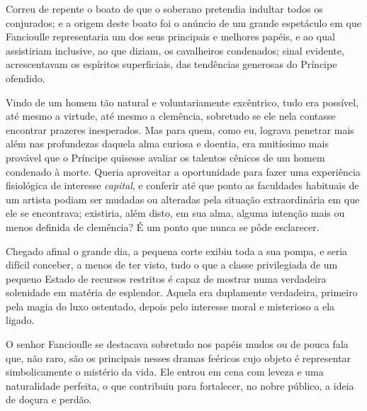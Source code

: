 Correu de repente o boato de que o soberano pretendia indultar todos os
conjurados; e a origem deste boato foi o anúncio de um grande
espetáculo em que Fancioulle representaria um dos seus principais e
melhores papéis, e ao qual assistiriam inclusive, ao que diziam, os
cavalheiros condenados; sinal evidente, acrescentavam os espíritos
superficiais, das tendências generosas do Príncipe ofendido.

Vindo de um homem tão natural e voluntariamente excêntrico, tudo era
possível, até mesmo a virtude, até mesmo a clemência, sobretudo se ele nela 
contasse encontrar prazeres inesperados. Mas para quem,
como eu, lograva penetrar mais além nas profundezas daquela
alma curiosa e doentia, era muitíssimo mais provável que o Príncipe
quisesse avaliar os talentos cênicos de um homem condenado à
morte. Queria aproveitar a oportunidade para fazer uma experiência
fisiológica de interesse \textit{capital}, e conferir até que ponto as
faculdades habituais de um artista podiam ser mudadas ou alteradas
pela situação extraordinária em que ele se encontrava;
existiria, além disto, em sua alma, alguma intenção mais ou menos definida
de clemência? É um ponto que nunca se pôde esclarecer.

\quebra

Chegado afinal o grande dia, a pequena corte exibiu toda a sua pompa,
e seria difícil conceber, a menos de ter visto, tudo o que a classe
privilegiada de um pequeno Estado de recursos restritos é capaz de mostrar
numa verdadeira solenidade em matéria de esplendor. Aquela era duplamente
verdadeira, primeiro pela magia do luxo ostentado, depois pelo
interesse moral e misterioso a ela ligado.

O senhor Fancioulle se destacava sobretudo nos papéis mudos ou de
pouca fala que, não raro, são os principais nesses dramas feéricos
cujo objeto é representar simbolicamente o mistério da vida. Ele entrou
em cena com leveza e uma naturalidade perfeita, o que contribuiu
para fortalecer, no nobre público, a ideia de doçura e perdão.

